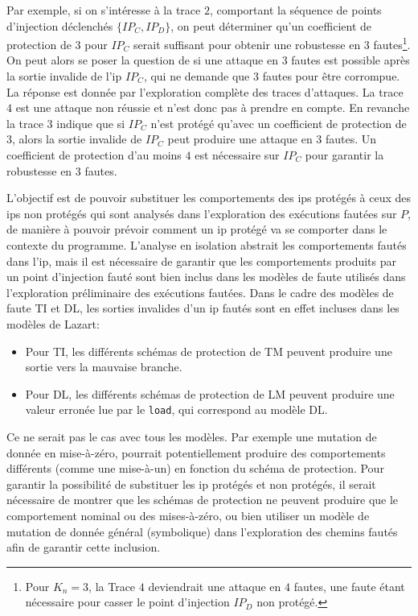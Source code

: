                 Par exemple, si on s'intéresse à la trace $2$, comportant la séquence de points d'injection déclenchés $\{ IP_C, IP_D \}$, on peut déterminer qu'un coefficient de protection de $3$ pour $IP_C$ serait suffisant pour obtenir une robustesse en 3 fautes\footnote{Pour $K_n = 3$, la Trace $4$ deviendrait une attaque en $4$ fautes, une faute étant nécessaire pour casser le point d'injection $IP_D$ non protégé.}.
                On peut alors se poser la question de si une attaque en 3 fautes est possible après la sortie invalide de l'\gls{ip} $IP_C$, qui ne demande que 3 fautes pour être corrompue.
                La réponse est donnée par l'exploration complète des traces d'attaques. La trace $4$ est une attaque non réussie et n'est donc pas à prendre en compte.
                En revanche la trace $3$ indique que si $IP_C$ n'est protégé qu'avec un coefficient de protection de $3$, alors la sortie invalide de $IP_C$ peut produire une attaque en $3$ fautes. Un coefficient de protection d'au moins $4$ est nécessaire sur $IP_C$ pour garantir la robustesse en 3 fautes.
    
                L'objectif est de pouvoir substituer les comportements des \gls{ip}s protégés à ceux des \gls{ip}s non protégés qui sont analysés dans l'exploration des exécutions fautées sur $P$, de manière à pouvoir prévoir comment un \gls{ip} protégé va se comporter dans le contexte du programme. 
                L'analyse en isolation abstrait les comportements fautés dans l'\gls{ip}, mais il est nécessaire de garantir que les comportements produits par un point d'injection fauté sont bien inclus dans les modèles de faute utilisés dans l'exploration préliminaire des exécutions fautées. 
                Dans le cadre des modèles de faute \gls{TI} et \gls{DL}, les sorties invalides d'un \gls{ip} fautés sont en effet incluses dans les modèles de Lazart:
                \begin{itemize}
                    \item Pour \gls{TI}, les différents schémas de protection de \gls{TM} peuvent produire une sortie vers la mauvaise branche.
                    \item Pour \gls{DL}, les différents schémas de protection de \gls{LM} peuvent produire une valeur erronée lue par le \texttt{load}, qui correspond au modèle \gls{DL}.
                \end{itemize}
    
                Ce ne serait pas le cas avec tous les modèles. Par exemple une mutation de donnée en mise-à-zéro, pourrait potentiellement produire des comportements différents (comme une mise-à-un) en fonction du schéma de protection.
                Pour garantir la possibilité de substituer les \gls{ip} protégés et non protégés, il serait nécessaire de montrer que les schémas de protection ne peuvent produire que le comportement nominal ou des mises-à-zéro, ou bien utiliser un modèle de mutation de donnée général (symbolique) dans l'exploration des chemins fautés afin de garantir cette inclusion.
     
